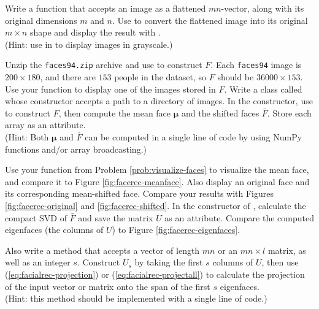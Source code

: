 Write a function that accepts an image as a flattened $mn$-vector, along with its original dimensions $m$ and $n$.
Use  to convert the flattened image into its original $m\times n$ shape and display the result with .
\\ (Hint: use  in  to display images in grayscale.)

Unzip the \texttt{faces94.zip} archive and use  to construct $F$.
Each \texttt{faces94} image is $200 \times 180$, and there are $153$ people in the dataset, so $F$ should be $36000 \times 153$.
Use your function to display one of the images stored in $F$.
\label{prob:visualize-faces}
\label{prob:meanFace}
Write a class called  whose constructor accepts a path to a directory of images.
In the constructor, use  to construct $F$, then compute the mean face $\boldsymbol\mu$ and the shifted faces $\bar{F}$.
Store each array as an attribute.
\\(Hint: Both $\boldsymbol\mu$ and $\bar{F}$ can be computed in a single line of code by using NumPy functions and/or array broadcasting.)

Use your function from Problem \ref{prob:visualize-faces} to visualize the mean face, and compare it to Figure \ref{fig:facerec-meanface}.
Also display an original face and its corresponding mean-shifted face.
Compare your results with Figures \ref{fig:facerec-original} and \ref{fig:facerec-shifted}.
In the constructor of , calculate the compact SVD of $\bar{F}$ and save the matrix $U$ as an attribute.
Compare the computed eigenfaces (the columns of $U$) to Figure \ref{fig:facerec-eigenfaces}.

Also write a method that accepts a vector of length $mn$ or an $mn\times l$ matrix, as well as an integer $s$.
Construct $U_s$ by taking the first $s$ columns of $U$, then use (\ref{eq:facialrec-projection}) or (\ref{eq:facialrec-projectall}) to calculate the projection of the input vector or matrix onto the span of the first $s$ eigenfaces.
\\(Hint: this method should be implemented with a single line of code.)
\label{prob:facialrec-project}

